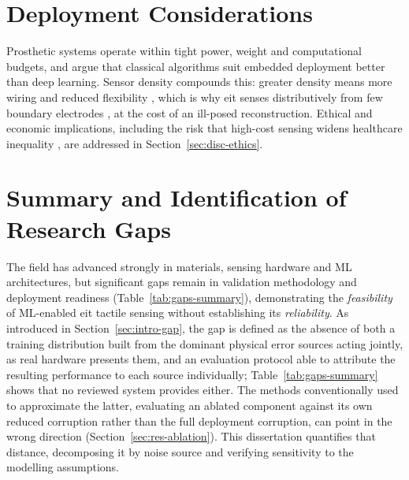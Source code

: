 \section{Deployment Considerations}
\label{sec:lit-deployment}

Prosthetic systems operate within tight power, weight and computational budgets, and \textcite{jiang2024fista} argue that classical algorithms suit embedded deployment better than deep learning. Sensor density compounds this: greater density means more wiring and reduced flexibility \parencite{shih2020, koo2024}, which is why \gls{eit} senses distributively from few boundary electrodes \parencite{silvera-tawil2015}, at the cost of an ill-posed reconstruction. Ethical and economic implications, including the risk that high-cost sensing widens healthcare inequality \parencite{mcdonald2021}, are addressed in Section~\ref{sec:disc-ethics}.


\section{Summary and Identification of Research Gaps}
\label{sec:lit-summary}

The field has advanced strongly in materials, sensing hardware and ML architectures, but significant gaps remain in validation methodology and deployment readiness (Table~\ref{tab:gaps-summary}), demonstrating the \emph{feasibility} of ML-enabled \gls{eit} tactile sensing without establishing its \emph{reliability}. As introduced in Section~\ref{sec:intro-gap}, the gap is defined as the absence of both a training distribution built from the dominant physical error sources acting jointly, as real hardware presents them, and an evaluation protocol able to attribute the resulting performance to each source individually; Table~\ref{tab:gaps-summary} shows that no reviewed system provides either. The methods conventionally used to approximate the latter, evaluating an ablated component against its own reduced corruption rather than the full deployment corruption, can point in the wrong direction (Section~\ref{sec:res-ablation}). This dissertation quantifies that distance, decomposing it by noise source and verifying sensitivity to the modelling assumptions.


